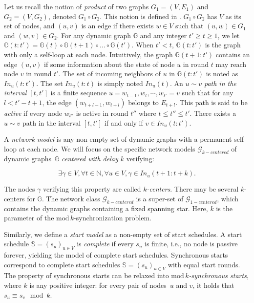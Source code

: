 \documentclass[11pt,letterpaper]{article}
\newcommand{\cent}{\gamma}
\newcommand{\edmargin}[2]{\marginpar{\raggedright\linespread{.7}\footnotesize #1: #2}}
\begin{document}
Let us recall the notion of \emph{product} of two graphs $G_1 = (V, E_1)$ and $G_2 = (V, G_2)$, denoted $G_1 \circ G_2$. This notion is defined in \cite{CBM19}.
$G_1 \circ G_2$ has $V$ as its set of nodes, and $(u,v)$ is an edge if there exists $w \in V$ such that $(u,w) \in G_1$ and $(w,v) \in G_2$.
For any dynamic graph $\mathds{G}$ and any integer $t' \geq t \geq 1$, we let $\mathds{G}(t:t') = \mathds{G}(t) \circ \mathds{G}(t+1) \circ \dots \circ \mathds{G}(t')$.
When $t' < t$, $\mathds{G}(t:t')$ is the graph with only a self-loop at each node.
Intuitively, the graph $\mathds{G}(t+1:t')$ contains an edge $(u,v)$ if some information about the state of node $u$ in round $t$ may reach node $v$ in round $t'$.
The set of incoming neighbors of $u$ in $\mathds{G}(t:t')$ is noted as $\mathit{In}_u(t:t')$.
The set $\mathit{In}_u(t:t)$ is simply noted $In_u(t)$.
An \emph{$u \sim v$ path in the interval $[t,t']$}\edmargin{sm}{$\sim$ usually denotes an equivalence relation.} is a finite sequence $u = w_{t-1}, w_t, \cdots, w_{t'} = v$
such that for any $l < t'-t+1$, the edge $(w_{t+l-1},w_{t+l})$ belongs to $E_{t+l}$.
This path is said to be \textit{active} if every node $w_{t''}$ is active in round $t''$ where $t \leq t'' \leq t'$.
There exists a $u \sim v$ path in the interval $[t,t']$ if and only if $v \in \mathit{In}_u(t:t')$.

A \emph{network model} is any non-empty set of dynamic graphs with a permanent self-loop at each node.
We will focus on the specific network models $\mathcal{G}_{k-centered}$ of dynamic graphs~$\mathds{G}$ \emph{centered with delay $k$} verifying: 

$$\exists \cent \in V, \forall t \in \mathds{N}, \forall u \in V, \cent \in \mathit{In}_u(t+1:t+k).$$

The nodes $\cent$ verifying this property are called \textit{$k$-centers}.
There may be several $k$-centers for $\mathds{G}$.
The network class $\mathcal{G}_{k-centered}$ is a super-set of $\mathcal{G}_{1-centered}$, which contains the dynamic graphs containing a fixed spanning star.
Here, $k$ is the parameter of the $\mathrm{mod}\,k$-synchronization problem.

Similarly, we define a \emph{start model} as a non-empty set of start schedules.
A start schedule $\mathds{S} = (s_u)_{u\in V}$ is \emph{complete} if every $s_u$ is finite, i.e.,
no node is passive forever, yielding the model of complete start schedules.
Synchronous starts correspond to complete start schedules $\mathds{S} = (s_u)_{u\in V}$ with
equal start rounds.	
The property of synchronous starts can be relaxed into \emph{$\mathrm{mod}\,k$-synchronous starts},
where $k$ is any positive integer: for every pair of nodes~$u$ and $v$, it holds that $s_u \equiv s_v \!\mod k$.
\end{document}
